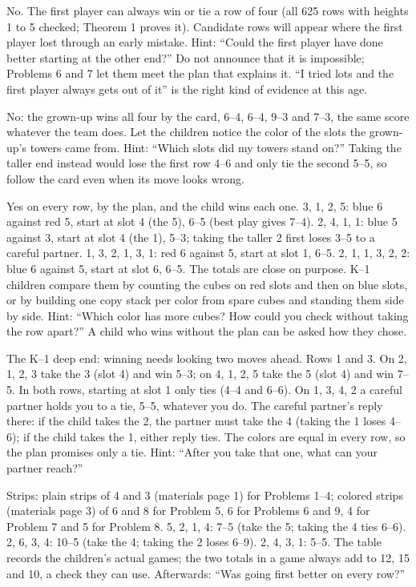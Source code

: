  No. The first player can always win or tie a row of four (all 625 rows with heights 1 to 5 checked; Theorem 1 proves it). Candidate rows will appear where the first player lost through an early mistake. Hint: ``Could the first player have done better starting at the other end?'' Do not announce that it is impossible; Problems 6 and 7 let them meet the plan that explains it. ``I tried lots and the first player always gets out of it'' is the right kind of evidence at this age.

 No: the grown-up wins all four by the card, 6--4, 6--4, 9--3 and 7--3, the same score whatever the team does. Let the children notice the color of the slots the grown-up's towers came from. Hint: ``Which slots did my towers stand on?'' Taking the taller end instead would lose the first row 4--6 and only tie the second 5--5, so follow the card even when its move looks wrong.

 Yes on every row, by the plan, and the child wins each one. 3, 1, 2, 5: blue 6 against red 5, start at slot 4 (the 5), 6--5 (best play gives 7--4). 2, 4, 1, 1: blue 5 against 3, start at slot 4 (the 1), 5--3; taking the taller 2 first loses 3--5 to a careful partner. 1, 3, 2, 1, 3, 1: red 6 against 5, start at slot 1, 6--5. 2, 1, 1, 3, 2, 2: blue 6 against 5, start at slot 6, 6--5. The totals are close on purpose. K--1 children compare them by counting the cubes on red slots and then on blue slots, or by building one copy stack per color from spare cubes and standing them side by side. Hint: ``Which color has more cubes? How could you check without taking the row apart?'' A child who wins without the plan can be asked how they chose.

 The K--1 deep end: winning needs looking two moves ahead. Rows 1 and 3. On 2, 1, 2, 3 take the 3 (slot 4) and win 5--3; on 4, 1, 2, 5 take the 5 (slot 4) and win 7--5. In both rows, starting at slot 1 only ties (4--4 and 6--6). On 1, 3, 4, 2 a careful partner holds you to a tie, 5--5, whatever you do. The careful partner's reply there: if the child takes the 2, the partner must take the 4 (taking the 1 loses 4--6); if the child takes the 1, either reply ties. The colors are equal in every row, so the plan promises only a tie. Hint: ``After you take that one, what can your partner reach?''

Strips: plain strips of 4 and 3 (materials page 1) for Problems 1--4; colored strips (materials page 3) of 6 and 8 for Problem 5, 6 for Problems 6 and 9, 4 for Problem 7 and 5 for Problem 8.
 5, 2, 1, 4: 7--5 (take the 5; taking the 4 ties 6--6). 2, 6, 3, 4: 10--5 (take the 4; taking the 2 loses 6--9). 2, 4, 3, 1: 5--5. The table records the children's actual games; the two totals in a game always add to 12, 15 and 10, a check they can use. Afterwards: ``Was going first better on every row?''

